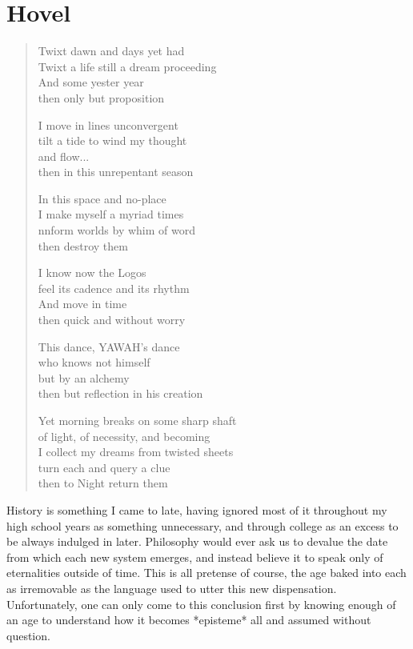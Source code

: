 \documentclass[ebook, 10pt, openright, onecolumn]{memoir}
\newenvironment{poetry}
{
  \begin{quote}
    \begin{itshape}
      \small
    }
    {
    \end{itshape}
  \end{quote}
}
\begin{document}
\chapter{Hovel}
\label{cha:hovel}

\begin{poetry}
  Twixt dawn and days yet had\\
Twixt a life still a dream proceeding\\
      And some yester year\\
then only but proposition

I move in lines unconvergent\\
tilt a tide to wind my thought\\
     and flow...\\
then in this unrepentant season

In this space and no-place\\
I make myself a myriad times\\
nnform worlds by whim of word\\
then destroy them

I know now the Logos\\
feel its cadence and its rhythm\\
     And move in time\\
then quick and without worry

This dance, YAWAH's dance\\
who knows not himself\\
but by an alchemy\\
then but reflection in his creation

Yet morning breaks on some sharp shaft\\
of light, of necessity, and becoming\\
I collect my dreams from twisted sheets\\
turn each and query a clue\\
then to Night return them
\end{poetry}


History is something I came to late, having ignored most of it throughout my
high school years as something unnecessary, and through college as an excess to
be always indulged in later.  Philosophy would ever ask us to devalue the date
from which each new system emerges, and instead believe it to speak only of
eternalities outside of time.  This is all pretense of course, the age baked
into each as irremovable as the language used to utter this new dispensation.
Unfortunately, one can only come to this conclusion first by knowing enough of
an age to understand how it becomes *episteme* all and assumed without
question.
\end{document}
